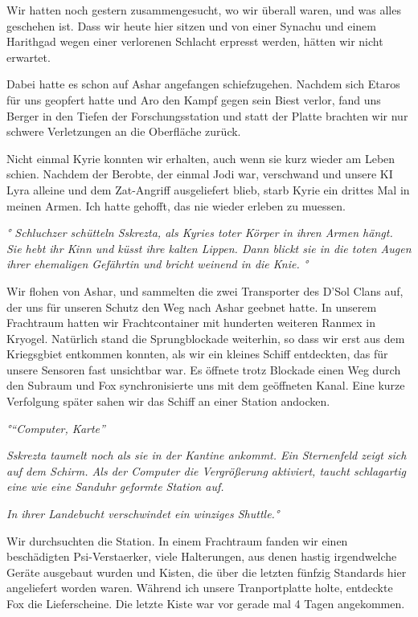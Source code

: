 \documentclass[11pt]{scrartcl}
\begin{document}
Wir hatten noch gestern zusammengesucht, wo wir überall waren, und was
alles geschehen ist. Dass wir heute hier sitzen und von einer Synachu
und einem Harithgad wegen einer verlorenen Schlacht erpresst werden,
hätten wir nicht erwartet.

Dabei hatte es schon auf Ashar angefangen schiefzugehen. Nachdem sich
Etaros für uns geopfert hatte und Aro den Kampf gegen sein Biest verlor,
fand uns Berger in den Tiefen der Forschungsstation und statt der Platte
brachten wir nur schwere Verletzungen an die Oberfläche zurück.

Nicht einmal Kyrie konnten wir erhalten, auch wenn sie kurz wieder am
Leben schien. Nachdem der Berobte, der einmal Jodi war, verschwand und
unsere KI Lyra alleine und dem Zat-Angriff ausgeliefert blieb, starb
Kyrie ein drittes Mal in meinen Armen. Ich hatte gehofft, das nie wieder
erleben zu muessen.

\emph{° Schluchzer schütteln Sskrezta, als Kyries toter Körper in ihren
Armen hängt. Sie hebt ihr Kinn und küsst ihre kalten Lippen. Dann blickt
sie in die toten Augen ihrer ehemaligen Gefährtin und bricht weinend in
die Knie. °}

Wir flohen von Ashar, und sammelten die zwei Transporter des D'Sol Clans
auf, der uns für unseren Schutz den Weg nach Ashar geebnet hatte. In
unserem Frachtraum hatten wir Frachtcontainer mit hunderten weiteren
Ranmex in Kryogel. Natürlich stand die Sprungblockade weiterhin, so dass
wir erst aus dem Kriegsgbiet entkommen konnten, als wir ein kleines
Schiff entdeckten, das für unsere Sensoren fast unsichtbar war. Es
öffnete trotz Blockade einen Weg durch den Subraum und Fox
synchronisierte uns mit dem geöffneten Kanal. Eine kurze Verfolgung
später sahen wir das Schiff an einer Station andocken.

\emph{°``Computer, Karte''}

\emph{Sskrezta taumelt noch als sie in der Kantine ankommt. Ein
Sternenfeld zeigt sich auf dem Schirm. Als der Computer die Vergrößerung
aktiviert, taucht schlagartig eine wie eine Sanduhr geformte Station
auf.}

\emph{In ihrer Landebucht verschwindet ein winziges Shuttle.°}

Wir durchsuchten die Station. In einem Frachtraum fanden wir einen
beschädigten Psi-Verstaerker, viele Halterungen, aus denen hastig
irgendwelche Geräte ausgebaut wurden und Kisten, die über die letzten
fünfzig Standards hier angeliefert worden waren. Während ich unsere
Tranportplatte holte, entdeckte Fox die Lieferscheine. Die letzte Kiste
war vor gerade mal 4 Tagen angekommen.
\end{document}
